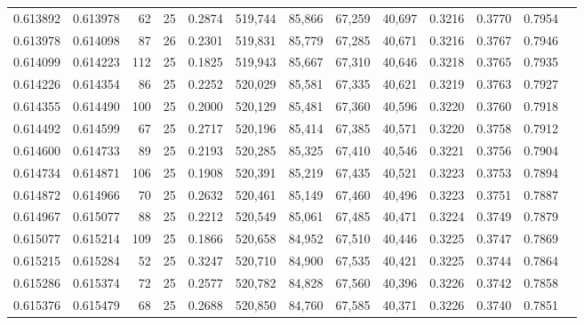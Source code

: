 \begin{tabular}{rrrrrrrrrrrrr}
0.613892 & 0.613978 &    62 &  25 &                                     0.2874 & 519,744 &  85,866 &  67,259 &  40,697 & 0.3216 & 0.3770 & 0.7954 \\
0.613978 & 0.614098 &    87 &  26 &                                     0.2301 & 519,831 &  85,779 &  67,285 &  40,671 & 0.3216 & 0.3767 & 0.7946 \\
0.614099 & 0.614223 &   112 &  25 &                                     0.1825 & 519,943 &  85,667 &  67,310 &  40,646 & 0.3218 & 0.3765 & 0.7935 \\
0.614226 & 0.614354 &    86 &  25 &                                     0.2252 & 520,029 &  85,581 &  67,335 &  40,621 & 0.3219 & 0.3763 & 0.7927 \\
0.614355 & 0.614490 &   100 &  25 &                                     0.2000 & 520,129 &  85,481 &  67,360 &  40,596 & 0.3220 & 0.3760 & 0.7918 \\
0.614492 & 0.614599 &    67 &  25 &                                     0.2717 & 520,196 &  85,414 &  67,385 &  40,571 & 0.3220 & 0.3758 & 0.7912 \\
0.614600 & 0.614733 &    89 &  25 &                                     0.2193 & 520,285 &  85,325 &  67,410 &  40,546 & 0.3221 & 0.3756 & 0.7904 \\
0.614734 & 0.614871 &   106 &  25 &                                     0.1908 & 520,391 &  85,219 &  67,435 &  40,521 & 0.3223 & 0.3753 & 0.7894 \\
0.614872 & 0.614966 &    70 &  25 &                                     0.2632 & 520,461 &  85,149 &  67,460 &  40,496 & 0.3223 & 0.3751 & 0.7887 \\
0.614967 & 0.615077 &    88 &  25 &                                     0.2212 & 520,549 &  85,061 &  67,485 &  40,471 & 0.3224 & 0.3749 & 0.7879 \\
0.615077 & 0.615214 &   109 &  25 &                                     0.1866 & 520,658 &  84,952 &  67,510 &  40,446 & 0.3225 & 0.3747 & 0.7869 \\
0.615215 & 0.615284 &    52 &  25 &                                     0.3247 & 520,710 &  84,900 &  67,535 &  40,421 & 0.3225 & 0.3744 & 0.7864 \\
0.615286 & 0.615374 &    72 &  25 &                                     0.2577 & 520,782 &  84,828 &  67,560 &  40,396 & 0.3226 & 0.3742 & 0.7858 \\
0.615376 & 0.615479 &    68 &  25 &                                     0.2688 & 520,850 &  84,760 &  67,585 &  40,371 & 0.3226 & 0.3740 & 0.7851 \\

\end{tabular}
